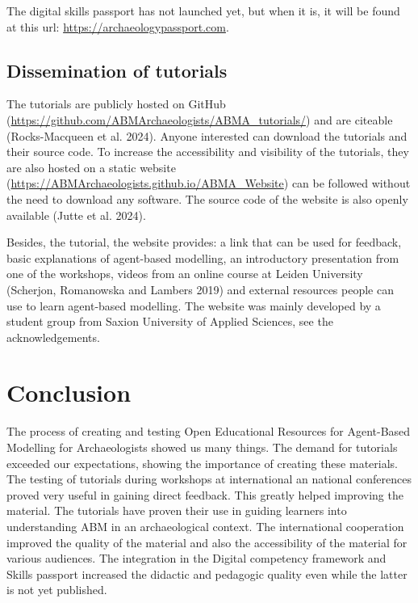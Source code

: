 \documentclass[
]{article}
\begin{document}
The digital skills passport has not launched yet, but when it is, it will be found at this url: \url{https://archaeologypassport.com}.

\hypertarget{dissemination-of-tutorials}{%
\subsection{Dissemination of tutorials}\label{dissemination-of-tutorials}}

The tutorials are publicly hosted on GitHub (\url{https://github.com/ABMArchaeologists/ABMA_tutorials/}) and are citeable (Rocks-Macqueen et al. 2024). Anyone interested can download the tutorials and their source code. To increase the accessibility and visibility of the tutorials, they are also hosted on a static website (\href{https://ABMArchaeologists.github.io/ABMA_Website/\#/}{https://ABMArchaeologists.github.io/ABMA\_Website}) can be followed without the need to download any software. The source code of the website is also openly available (Jutte et al. 2024).

Besides, the tutorial, the website provides: a link that can be used for feedback, basic explanations of agent-based modelling, an introductory presentation from one of the workshops, videos from an online course at Leiden University (Scherjon, Romanowska and Lambers 2019) and external resources people can use to learn agent-based modelling. The website was mainly developed by a student group from Saxion University of Applied Sciences, see the acknowledgements.

\hypertarget{conclusion}{%
\section{Conclusion}\label{conclusion}}

The process of creating and testing Open Educational Resources for Agent-Based Modelling for Archaeologists showed us many things. The demand for tutorials exceeded our expectations, showing the importance of creating these materials. The testing of tutorials during workshops at international an national conferences proved very useful in gaining direct feedback. This greatly helped improving the material. The tutorials have proven their use in guiding learners into understanding ABM in an archaeological context. The international cooperation improved the quality of the material and also the accessibility of the material for various audiences. The integration in the Digital competency framework and Skills passport increased the didactic and pedagogic quality even while the latter is not yet published.
\end{document}
